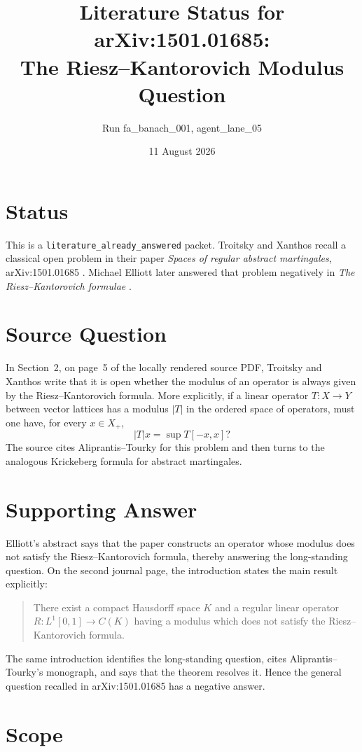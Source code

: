 \documentclass[11pt]{article}
\title{Literature Status for arXiv:1501.01685:\\
The Riesz--Kantorovich Modulus Question}
\author{Run fa\_banach\_001, agent\_lane\_05}
\date{11 August 2026}
\begin{document}
\maketitle

\section*{Status}

This is a \texttt{literature\_already\_answered} packet.  Troitsky and
Xanthos recall a classical open problem in their paper \emph{Spaces of regular
abstract martingales}, arXiv:1501.01685 \cite{TX15}.  Michael Elliott later
answered that problem negatively in \emph{The Riesz--Kantorovich formulae}
\cite{Elliott19}.

\section*{Source Question}

In Section~2, on page~5 of the locally rendered source PDF, Troitsky and
Xanthos write that it is open whether the modulus of an operator is always
given by the Riesz--Kantorovich formula.  More explicitly, if a linear
operator $T:X\to Y$ between vector lattices has a modulus $|T|$ in the ordered
space of operators, must one have, for every $x\in X_+$,
\[
 |T|x=\sup T[-x,x]?
\]
The source cites Aliprantis--Tourky for this problem and then turns to the
analogous Krickeberg formula for abstract martingales.

\section*{Supporting Answer}

Elliott's abstract says that the paper constructs an operator whose modulus
does not satisfy the Riesz--Kantorovich formula, thereby answering the
long-standing question.  On the second journal page, the introduction states
the main result explicitly:
\begin{quote}
There exist a compact Hausdorff space $K$ and a regular linear operator
$R:L^1[0,1]\to C(K)$ having a modulus which does not satisfy the
Riesz--Kantorovich formula.
\end{quote}
The same introduction identifies the long-standing question, cites
Aliprantis--Tourky's monograph, and says that the theorem resolves it.  Hence
the general question recalled in arXiv:1501.01685 has a negative answer.

\section*{Scope}
\end{document}
